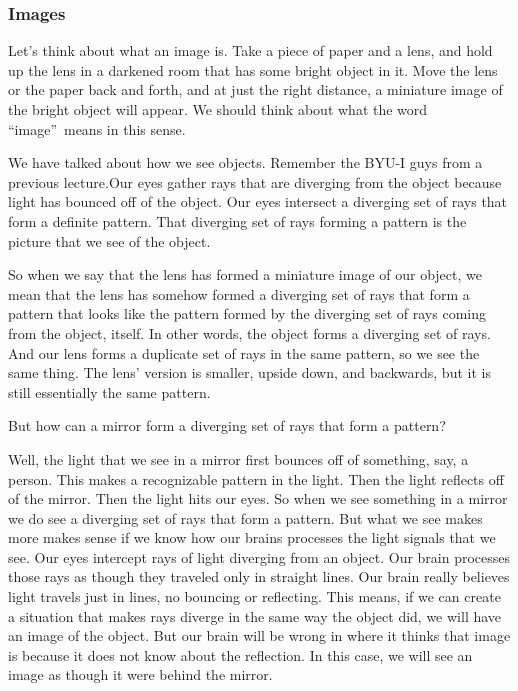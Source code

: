\documentclass{article}
\begin{document}
\subsubsection{Images}

Let's think about what an image is. Take a piece of paper and a lens, and
hold up the lens in a darkened room that has some bright object in it. Move
the lens or the paper back and forth, and at just the right distance, a
miniature image of the bright object will appear. We should think about what
the word \textquotedblleft image\textquotedblright\ means in this sense.

We have talked about how we see
objects. Remember the BYU-I guys from a previous lecture.Our eyes gather rays that are
diverging from the object because light has bounced off of the object. Our
eyes intersect a diverging set of rays that form a definite pattern. That
diverging set of rays forming a pattern is the picture that we see of the
object.

So when we say that the lens has formed a miniature image of our object, we
mean that the lens has somehow formed a diverging set of rays that form a
pattern that looks like the pattern formed by the diverging set of rays
coming from the object, itself. In other words, the object forms a diverging
set of rays. And our lens forms a duplicate set of rays in the same pattern,
so we see the same thing. The lens' version is smaller, upside down, and
backwards, but it is still essentially the same pattern.

But how can a mirror form a diverging set of rays that form a pattern?

Well, the light that we see in a mirror first bounces off of something, say,
a person. This makes a recognizable pattern in the light. Then the light
reflects off of the mirror. Then the light hits our eyes. So when we see
something in a mirror we do see a diverging set of rays that form a pattern.
But what we see makes more makes sense if we know how our brains processes
the light signals that we see. Our eyes intercept rays of light diverging
from an object. Our brain processes those rays as though they traveled only
in straight lines. Our brain really believes light travels just in lines, no
bouncing or reflecting. This means, if we can create a situation that makes
rays diverge in the same way the object did, we will have an image of the
object. But our brain will be wrong in where it thinks that image is because
it does not know about the reflection. In this case, we will see an image as
though it were behind the mirror.
\end{document}

